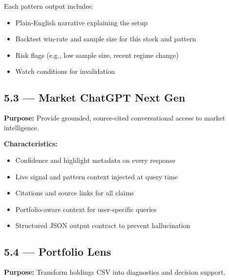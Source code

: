 \documentclass[11pt,a4paper]{article}
\begin{document}
\vspace{0.5cm}

Each pattern output includes:
\begin{itemize}
    \item Plain-English narrative explaining the setup
    \item Backtest win-rate and sample size for this stock and pattern
    \item Risk flags (e.g., low sample size, recent regime change)
    \item Watch conditions for invalidation
\end{itemize}

\subsection{5.3 — Market ChatGPT Next Gen}

\textbf{Purpose:} Provide grounded, source-cited conversational access to market intelligence.

\vspace{0.3cm}

\textbf{Characteristics:}
\begin{itemize}
    \item Confidence and highlight metadata on every response
    \item Live signal and pattern context injected at query time
    \item Citations and source links for all claims
    \item Portfolio-aware context for user-specific queries
    \item Structured JSON output contract to prevent hallucination
\end{itemize}

\subsection{5.4 — Portfolio Lens}

\textbf{Purpose:} Transform holdings CSV into diagnostics and decision support.

\vspace{0.3cm}
\end{document}
